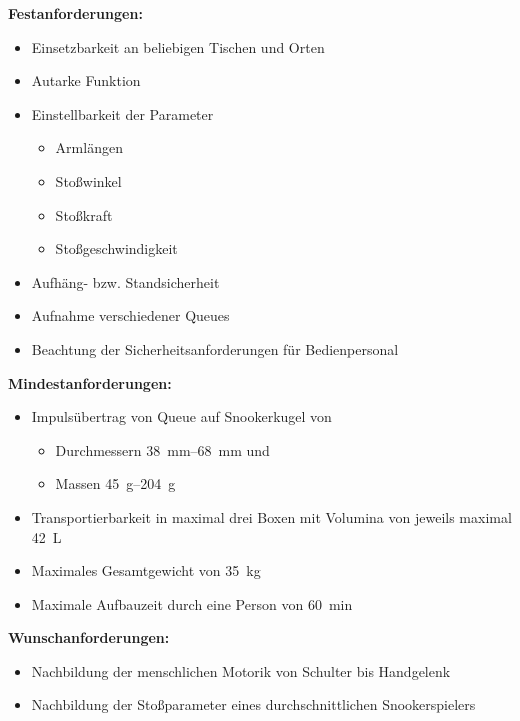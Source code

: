 		\textbf{Festanforderungen:}
		\begin{itemize}
			\item Einsetzbarkeit an beliebigen Tischen und Orten
			\item Autarke Funktion
			\item Einstellbarkeit der Parameter
			\begin{itemize}
				\item Armlängen
				\item Stoßwinkel
				\item Stoßkraft
				\item Stoßgeschwindigkeit
			\end{itemize}
			\item Aufhäng- bzw. Standsicherheit
			\item Aufnahme verschiedener Queues
			\item Beachtung der Sicherheitsanforderungen für Bedienpersonal
		\end{itemize}

		\textbf{Mindestanforderungen:}
		\begin{itemize}
			\item Impulsübertrag von Queue auf Snookerkugel von
			\begin{itemize}
				\item Durchmessern \SIrange{38}{68}{\milli\metre} und
				\item Massen \SIrange{45}{204}{\gram}
			\end{itemize}
			\item Transportierbarkeit in maximal drei Boxen mit Volumina von jeweils maximal \SI{42}{L}
			\item Maximales Gesamtgewicht von \SI{35}{\kilo\gram}
			\item Maximale Aufbauzeit durch eine Person von \SI{60}{\minute}
		\end{itemize}

		\textbf{Wunschanforderungen:}
		\begin{itemize}
			\item Nachbildung der menschlichen Motorik von Schulter bis Handgelenk
			\item Nachbildung der Stoßparameter eines durchschnittlichen Snookerspielers
		\end{itemize}